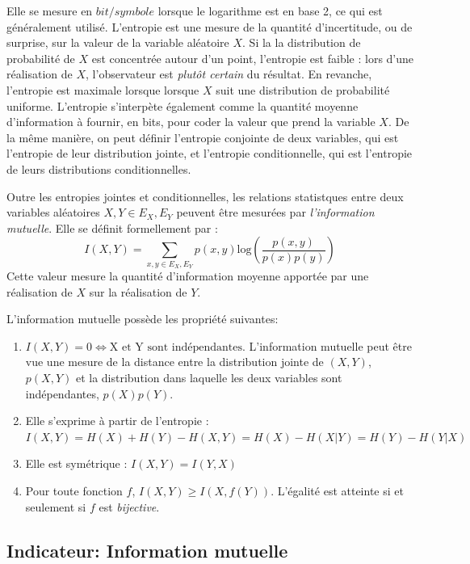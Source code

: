 Elle se mesure en $bit/symbole$ lorsque le logarithme est en base 2, ce qui est généralement utilisé. 
L'entropie est une mesure de la quantité d'incertitude, ou de surprise, sur la valeur de la variable aléatoire $X$. Si la la distribution de probabilité de $X$ est concentrée autour d'un point, l'entropie est faible : lors d'une réalisation de $X$, l'observateur est \emph{plutôt certain} du résultat. En revanche, l'entropie est maximale lorsque lorsque $X$ suit une distribution de probabilité uniforme.
L'entropie s'interpète également comme la quantité moyenne d'information à fournir, en bits, pour coder la valeur que prend la variable $X$.
De la même manière, on peut définir l'entropie conjointe de deux variables, qui est l'entropie de leur distribution jointe, et l'entropie conditionnelle, qui est l'entropie de leurs distributions conditionnelles.

Outre les entropies jointes et conditionnelles, les relations statistques entre deux variables aléatoires $X,Y \in E_X,E_Y$ peuvent être mesurées par \emph{l'information mutuelle}. Elle se définit formellement par : 
\begin{equation}
 I(X,Y) = \sum_{x,y \in E_X,E_Y}{p(x,y)\textrm{log}(\frac{p(x,y)}{p(x)p(y)})}
\end{equation}
Cette valeur mesure la quantité d'information moyenne apportée par une réalisation de $X$ sur la réalisation de $Y$.

L'information mutuelle possède les propriété suivantes:
\begin{enumerate}
\item $I(X,Y) = 0 \Leftrightarrow \textrm{X et Y sont indépendantes}$. L'information mutuelle peut être vue une mesure de la distance entre la distribution jointe de $(X,Y)$, $p(X,Y)$ et la distribution dans laquelle les deux variables sont indépendantes, $p(X)p(Y)$.
\item Elle s'exprime à partir de l'entropie : $I(X,Y) = H(X) + H(Y) - H(X,Y) = H(X) - H(X|Y) = H(Y) - H(Y|X)$
\item Elle est symétrique : $I(X,Y) = I(Y,X)$
\item Pour toute fonction $f$, $I(X,Y) \geq I(X,f(Y))$. L'égalité est atteinte si et seulement si $f$ est \emph{bijective}.
\end{enumerate}


\subsection{Indicateur: Information mutuelle}

